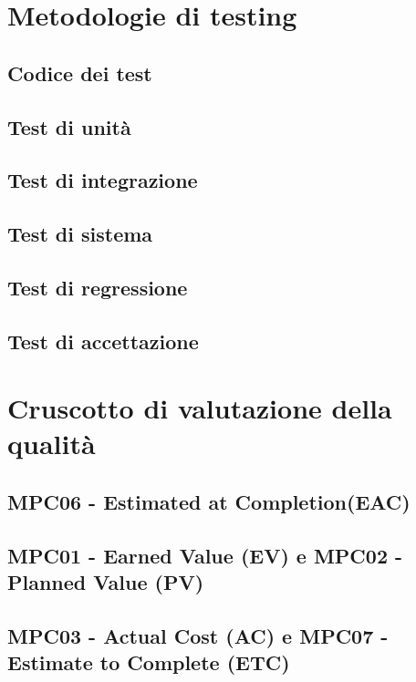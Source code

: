 \documentclass[italian,12pt]{article} %
\begin{document}
\section{Metodologie di testing}

\subsection{Codice dei test}

\subsection{Test di unità}

\subsection{Test di integrazione}

\subsection{Test di sistema}

\subsection{Test di regressione}

\subsection{Test di accettazione}


\newpage

\section{Cruscotto di valutazione della qualità}

\subsection{MPC06 - Estimated at Completion(EAC)}

\subsection{MPC01 - Earned Value (EV) e MPC02 - Planned Value (PV)}

\subsection{MPC03 - Actual Cost (AC) e MPC07 - Estimate to Complete (ETC)}
\end{document}
